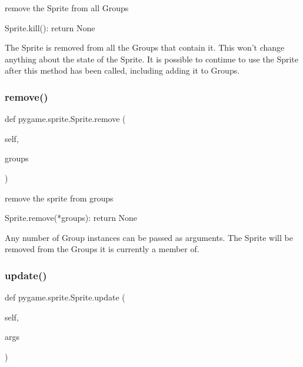 \begin{DoxyVerb}remove the Sprite from all Groups

Sprite.kill(): return None

The Sprite is removed from all the Groups that contain it. This won't
change anything about the state of the Sprite. It is possible to
continue to use the Sprite after this method has been called, including
adding it to Groups.\end{DoxyVerb}
 \mbox{\label{classpygame_1_1sprite_1_1_sprite_ad13c08925f3ae5869f6ae3c0575b8d34}} 
\subsubsection{\texorpdfstring{remove()}{remove()}}
{\footnotesize\ttfamily def pygame.\+sprite.\+Sprite.\+remove (\begin{DoxyParamCaption}\item[{}]{self,  }\item[{}]{groups }\end{DoxyParamCaption})}

\begin{DoxyVerb}remove the sprite from groups

Sprite.remove(*groups): return None

Any number of Group instances can be passed as arguments. The Sprite
will be removed from the Groups it is currently a member of.\end{DoxyVerb}
 \mbox{\label{classpygame_1_1sprite_1_1_sprite_adbe463fbe81302ca4f63535eb00e109d}} 
\subsubsection{\texorpdfstring{update()}{update()}}
{\footnotesize\ttfamily def pygame.\+sprite.\+Sprite.\+update (\begin{DoxyParamCaption}\item[{}]{self,  }\item[{}]{args }\end{DoxyParamCaption})}

